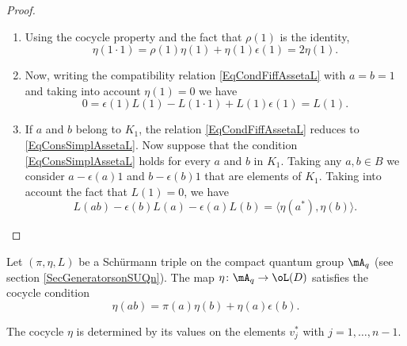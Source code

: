 \begin{proof}
    \begin{enumerate}
        \item
            Using the cocycle property and the fact that $\rho(1)$ is the identity,
            \begin{equation}
                \eta(1\cdot 1)=\rho(1)\eta(1)+\eta(1)\epsilon(1)=2\eta(1).
            \end{equation}
        \item
            Now, writing the compatibility relation \eqref{EqCondFiffAssetaL} with $a=b=1$ and taking into account $\eta(1)=0$ we have
            \begin{equation}
                0=\epsilon(1)L(1)-L(1\cdot 1)+L(1)\epsilon(1)=L(1).
            \end{equation}
        \item
            If $a$ and $b$ belong to $K_1$, the relation \eqref{EqCondFiffAssetaL} reduces to \eqref{EqConsSimplAssetaL}. Now suppose that the condition \eqref{EqConsSimplAssetaL} holds for every $a$ and $b$ in $K_1$. Taking any $a,b\in B$ we consider $a-\epsilon(a)1$ and $b-\epsilon(b)1$ that are elements of $K_1$. Taking into account the fact that $L(1)=0$, we have
            \begin{equation}
                L(ab)-\epsilon(b)L(a)-\epsilon(a)L(b)=\langle \eta(a^*), \eta(b)\rangle .
            \end{equation}
    \end{enumerate}    
\end{proof}


Let $(\pi,\eta,L)$ be a Schürmann triple on the compact quantum group $\mA_q$ (see section \ref{SecGeneratorsonSUQn}). The map $\eta\colon \mA_q\to \oL(D) $ satisfies the cocycle condition
\begin{equation}
    \eta(ab)=\pi(a)\eta(b)+\eta(a)\epsilon(b).
\end{equation}

\begin{proposition}     \label{PropCocycleDeteretavjnmu}
    The cocycle $\eta$ is determined by its values on the elements $v_j^*$ with $j=1,\ldots,n-1$.
\end{proposition}

